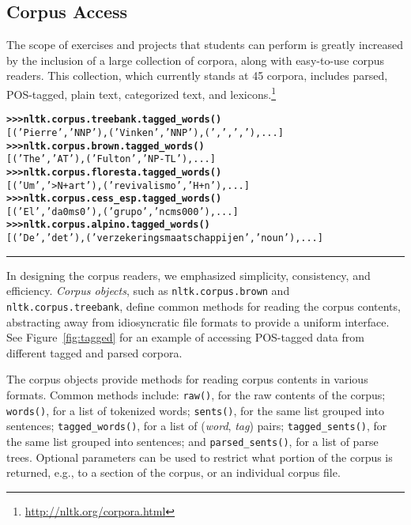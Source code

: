 \documentclass[11pt]{article}
\newcommand{\code}[1]{\texttt{\small #1}}
\begin{document}
\subsection{Corpus Access}

The scope of exercises and projects that students can perform is
greatly increased by the inclusion of a large collection of corpora,
along with easy-to-use corpus readers.  This collection, which
currently stands at 45 corpora, includes parsed, POS-tagged, plain
text, categorized text, and lexicons.\footnote{\url{http://nltk.org/corpora.html}}

\begin{figure*}[t]
{\small
\begin{alltt}
\textbf{>>> nltk.corpus.treebank.tagged_words()}
[('Pierre', 'NNP'), ('Vinken', 'NNP'), (',', ','), ...]
\textbf{>>> nltk.corpus.brown.tagged_words()}
[('The', 'AT'), ('Fulton', 'NP-TL'), ...]
\textbf{>>> nltk.corpus.floresta.tagged_words()}
[('Um', '>N+art'), ('revivalismo', 'H+n'), ...]
\textbf{>>> nltk.corpus.cess_esp.tagged_words()}
[('El', 'da0ms0'), ('grupo', 'ncms000'), ...]
\textbf{>>> nltk.corpus.alpino.tagged_words()}
[('De', 'det'), ('verzekeringsmaatschappijen', 'noun'), ...]
\end{alltt}}
\caption{Accessing Different Corpora via a Uniform Interface}
\label{fig:tagged}
\vspace*{1ex}\hrule
\end{figure*}

In designing the corpus readers, we emphasized simplicity,
consistency, and efficiency.  \emph{Corpus objects}, such as
\code{nltk.corpus.brown} and \code{nltk.corpus.treebank}, define
common methods for reading the corpus contents, abstracting
away from idiosyncratic file formats to provide a uniform interface.
See Figure~\ref{fig:tagged} for an example of accessing POS-tagged
data from different tagged and parsed corpora.

The corpus objects provide methods for reading corpus contents
in various formats.  Common methods include:
%
\code{raw()}, for the raw contents of the corpus;
\code{words()}, for a list of tokenized words;
\code{sents()}, for the same list grouped into sentences;
\code{tagged\_words()}, for a list of (\textit{word}, \textit{tag}) pairs;
\code{tagged\_sents()}, for the same list grouped into sentences;
and
\code{parsed\_sents()}, for a list of parse trees.
%
Optional parameters can be used to restrict what portion of the corpus
is returned, e.g., to a section of the corpus, or an individual corpus
file.
\end{document}

